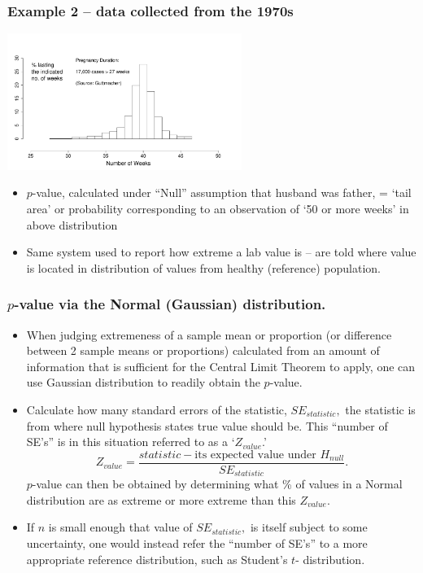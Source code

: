 \documentclass[handout]{beamer}\usepackage[]{graphicx}\usepackage[]{color}
\begin{document}
\begin{frame}
\frametitle{Example 2 -- data collected from the 1970s}

	\begin{center}
		\includegraphics[width=3in]{PregnancyDuration.pdf}
	\end{center}
	
	\begin{itemize}
		\setlength\itemsep{.3em}
		\item $p$-value, calculated under ``Null'' assumption 
	that husband was father,  =  `tail area' or probability corresponding  to an observation
	of `50 or more weeks' in  above distribution 
	
	\item Same system used to report how extreme a lab value is -- are told
	where value is located in distribution of values from  healthy (reference) population.
	\end{itemize} 
	

\end{frame}



\begin{frame}
\frametitle{$p$-value via the Normal (Gaussian) distribution.}

\begin{footnotesize}
\begin{itemize}
\item When judging extremeness of a sample mean or proportion (or  difference between 2 sample means or proportions) calculated from an amount of information that is sufficient for the Central Limit Theorem to apply, one can use Gaussian distribution to readily obtain the $p$-value.
\item Calculate how many standard errors of the statistic, $SE_{statistic},$ the statistic is from where null hypothesis states true value should be.  This ``number of SE's'' is in this situation referred to as a `$Z_{value}$.'
$$Z_{value} = \frac{statistic -  \textrm{its expected value under } H_{null} }{SE_{statistic}}.$$
$p$-value can then be obtained by determining what \% of values in a Normal distribution are as extreme or more extreme than this $Z_{value}.$
\item
If $n$ is small enough that value of $SE_{statistic},$ is itself subject to some 
uncertainty, one would instead refer the ``number of SE's'' to a more appropriate reference distribution, such as Student's $t$- distribution.
\end{itemize}

\end{footnotesize}
\end{frame}
\end{document}

